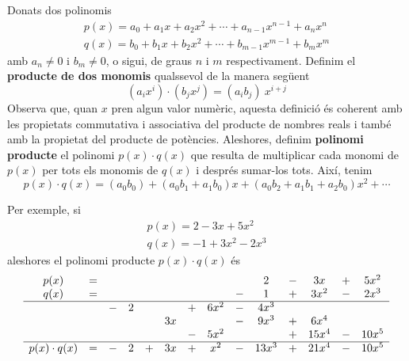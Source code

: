 Donats dos polinomis\begin{equation*}
\begin{array}{l}
p(x)=a_{0}+a_{1}x+a_{2}x^{2}+\cdots +a_{n-1}x^{n-1}+a_{n}x^{n} \\
q(x)=b_{0}+b_{1}x+b_{2}x^{2}+\cdots +b_{m-1}x^{m-1}+b_{m}x^{m}\end{array}\end{equation*}amb $a_{n}\neq 0$ i $b_{m}\neq 0$, o sigui, de graus $n$ i $m$
respectivament. Definim el \textbf{producte de dos monomis }qualssevol
de la manera següent\begin{equation*}
\left( a_{i}x^{i}\right) \cdot \left( b_{j}x^{j}\right) =\left(
a_{i}b_{j}\right) ~x^{i+j}
\end{equation*}
Observa que, quan $x$ pren algun valor numèric, aquesta definició és coherent amb les propietats commutativa i associativa del
producte de nombres reals i també amb la propietat del producte
de potències. Aleshores, definim \textbf{polinomi producte} el polinomi $p(x)\cdot q(x)$ que resulta de multiplicar cada monomi de $p(x)$ per tots
els monomis de $q(x)$ i després sumar-los tots. Així, tenim\begin{equation*}
p(x)\cdot
q(x)=(a_{0}b_{0})+(a_{0}b_{1}+a_{1}b_{0})x+(a_{0}b_{2}+a_{1}b_{1}+a_{2}b_{0})x^{2}+\cdots
\end{equation*}

Per exemple, si\begin{equation*}
\begin{array}{l}
p(x)=2-3x+5x^{2} \\
q(x)=-1+3x^{2}-2x^{3}\end{array}\end{equation*}aleshores el polinomi producte $p(x)\cdot q(x)$ és\begin{equation*}
\begin{array}{cccccccccccccc}
p(x) & = & & & & & & & & 2 & - & 3x & + & 5x^{2} \\
q(x) & = & & & & & & & - & 1 & + & 3x^{2} & - & 2x^{3} \\ \hline
& & - & 2 & & & + & 6x^{2} & - & 4x^{3} & & & & \\
& & & & & 3x & & & - & 9x^{3} & + & 6x^{4} & & \\
& & & & & & - & 5x^{2} & & & + & 15x^{4} & - & 10x^{5} \\ \hline
p(x)\cdot q(x) & = & - & 2 & + & 3x & + & x^{2} & - & 13x^{3} & + & 21x^{4}
& - & 10x^{5}\end{array}\end{equation*}

